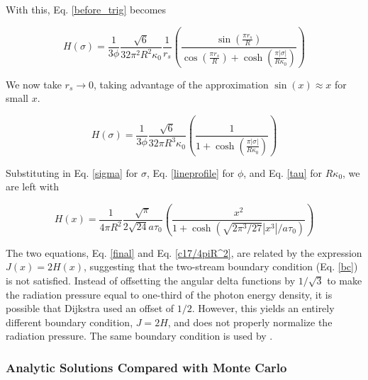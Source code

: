 \documentclass[onecolumn]{aastex63}
\begin{document}
\noindent With this, Eq. \ref{before_trig} becomes

\begin{equation} \label{after_trig}
    H(\sigma) = \frac{1}{3 \phi} \frac{\sqrt{6}}{32 \pi^2 R^2 \kappa_0} \frac{1}{r_s} \left(\frac{\sin{\left(\frac{\pi r_s}{R}\right)}}{\cos{\left(\frac{\pi r_s}{R}\right)} + \cosh{\left(\frac{\pi |\sigma|}{R\kappa_0}\right)}}\right)
\end{equation}

\noindent We now take $r_s \rightarrow 0$, taking advantage of the approximation $\sin(x) \approx x$ for small $x$.

\begin{equation}
    H(\sigma) = \frac{1}{3 \phi} \frac{\sqrt{6}}{32 \pi R^3 \kappa_0} \left(\frac{1}{1 + \cosh{\left(\frac{\pi |\sigma|}{R\kappa_0}\right)}}\right)
\end{equation}

\noindent Substituting in Eq. \ref{sigma} for $\sigma$, Eq. \ref{lineprofile} for $\phi$, and Eq. \ref{tau} for $R \kappa_0$, we are left with

\begin{equation} \label{final}
    H(x) = \frac{1}{4\pi R^2}\frac{\sqrt{\pi}}{2\sqrt{24}a\tau_0} \left(\frac{x^2}{1 + \cosh{\left(\sqrt{2\pi^3/27}|x^3|/a\tau_0\right)}}\right)
\end{equation}

The two equations, Eq. \ref{final} and Eq. \ref{c17/4piR^2}, are related by the expression $J(x) = 2 H(x)$, suggesting that the two-stream boundary condition (Eq. \ref{bc}) is not satisfied. Instead of offsetting the angular delta functions by $1/\sqrt{3}$ to make the radiation pressure equal to one-third of the photon energy density, it is possible that Dijkstra used an offset of $1/2$. However, this yields an entirely different boundary condition, $J = 2H$, and does not properly normalize the radiation pressure. The same boundary condition is used by \cite{harrington1973}.

\subsubsection{Analytic Solutions Compared with Monte Carlo} \label{numerical}
\end{document}
